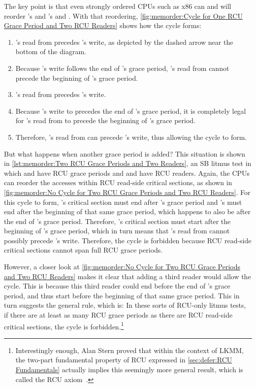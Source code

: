 The key point is that even strongly ordered CPUs such as x86 can
and will reorder 's and 's  and
.
With that reordering,
\cref{fig:memorder:Cycle for One RCU Grace Period and Two RCU Readers}
shows how the cycle forms:

\begin{enumerate}
\item	{}'s read from  precedes 's write, as
	depicted by the dashed arrow near the bottom of the diagram.
\item	Because 's write follows the end of 's grace period,
	's read from  cannot precede the beginning of
	's grace period.
\item	{}'s read from  precedes 's write.
\item	Because 's write to  precedes the end of
	's grace period, it is completely legal for 's
	read from  to precede the beginning of 's grace period.
\item	Therefore, 's read from  can precede 's
	write, thus allowing the cycle to form.
\end{enumerate}

But what happens when another grace period is added?
This situation is shown in
\cref{lst:memorder:Two RCU Grace Periods and Two Readers},
an SB litmus test in which  and  have RCU grace periods
and  and  have RCU readers.
Again, the CPUs can reorder the accesses within RCU read-side critical
sections, as shown in
\cref{fig:memorder:No Cycle for Two RCU Grace Periods and Two RCU Readers}.
For this cycle to form, 's critical section must
end after 's grace period and 's must end after the
beginning of that same grace period, which happens to also be after the
end of 's grace period.
Therefore, 's critical section must start after the beginning
of 's grace period, which in turn means that 's
read from  cannot possibly precede 's write.
Therefore, the cycle is forbidden because RCU read-side critical sections
cannot span full RCU grace periods.

However, a closer look at
\cref{fig:memorder:No Cycle for Two RCU Grace Periods and Two RCU Readers}
makes it clear that adding a third reader would allow the cycle.
This is because this third reader could end before the end of 's
grace period, and thus start before the beginning of that same grace
period.
This in turn suggests the general rule, which is:
In these sorts of RCU-only litmus tests, if there are at least as many
RCU grace periods as there are RCU read-side critical sections,
the cycle is forbidden.\footnote{
	Interestingly enough, Alan Stern proved that within the context
	of LKMM, the two-part fundamental property of RCU expressed
	in \cref{sec:defer:RCU Fundamentals} actually implies
	this seemingly more general result, which is called the RCU
	axiom~\cite{Alglave:2018:FSC:3173162.3177156}.}

